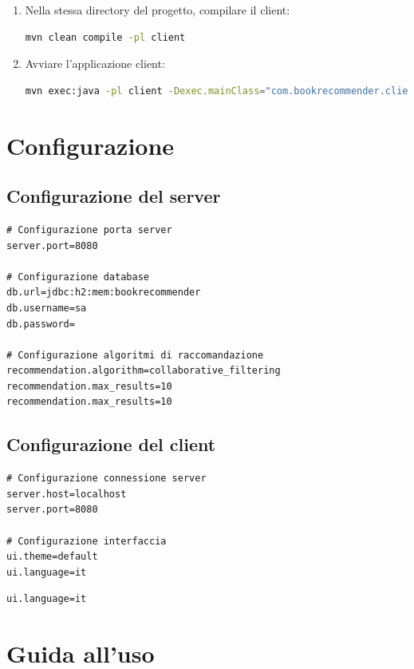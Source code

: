 \documentclass[12pt,a4paper]{article}
\begin{document}
\begin{enumerate}
    \item Nella stessa directory del progetto, compilare il client:
    
    \begin{lstlisting}[language=bash]
mvn clean compile -pl client
    \end{lstlisting}
    
    \item Avviare l'applicazione client:
    
    \begin{lstlisting}[language=bash]
mvn exec:java -pl client -Dexec.mainClass="com.bookrecommender.client.ClientMain"
    \end{lstlisting}
\end{enumerate}

\section{Configurazione}

\subsection{Configurazione del server}

\begin{verbatim}
# Configurazione porta server
server.port=8080

# Configurazione database
db.url=jdbc:h2:mem:bookrecommender
db.username=sa
db.password=

# Configurazione algoritmi di raccomandazione
recommendation.algorithm=collaborative_filtering
recommendation.max_results=10
recommendation.max_results=10
\end{verbatim}

\subsection{Configurazione del client}

\begin{verbatim}
# Configurazione connessione server
server.host=localhost
server.port=8080

# Configurazione interfaccia
ui.theme=default
ui.language=it
\end{verbatim}
\begin{lstlisting}
ui.language=it
\end{lstlisting}

\section{Guida all'uso}
\end{document}
